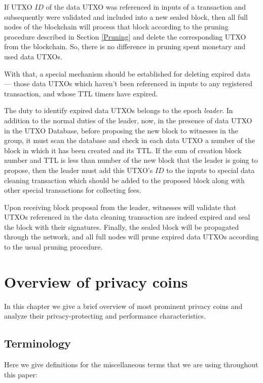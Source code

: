 \documentclass[8pt,fleqn,openany]{book}
\begin{document}
If UTXO $ID$ of the data UTXO was referenced in inputs of a transaction and subsequently were validated and included into a new sealed block, then all full nodes of the blockchain will process that block according to the pruning procedure described in Section \ref{Pruning} and delete the corresponding UTXO from the blockchain. So, there is no difference in pruning spent monetary and used data UTXOs.

With that, a special mechanism should be established for deleting expired data --- those data UTXOs which haven't been referenced in inputs to any registered transaction, and whose TTL timers have expired.

The duty to identify expired data UTXOs belongs to the epoch \textit{leader}. In addition to the normal duties of the leader, now, in the presence of data UTXO in the UTXO Database, before proposing the new block to witnesses in the group, it must scan the database and check in each data UTXO a number of the block in which it has been created and its TTL. If the sum of creation block number and TTL is less than number of the new block that the leader is going to propose, then the leader must add this UTXO's $ID$ to the inputs to special data cleaning transaction which should be added to the proposed block along with other special transactions for collecting fees. 

Upon receiving block proposal from the leader, witnesses will validate that UTXOs referenced in the data cleaning transaction are indeed expired and seal the block with their signatures. Finally, the sealed block will be propagated through the network, and all full nodes will prune expired data UTXOs according to the usual pruning procedure.

\chapter{Overview of privacy coins}\label{app:privacy-coins}

In this chapter we give a brief overview of most prominent privacy coins and analyze their privacy-protecting and performance characteristics.

\section{Terminology}
Here we give definitions for the miscellaneous terms that we are using throughout this paper:
\end{document}
